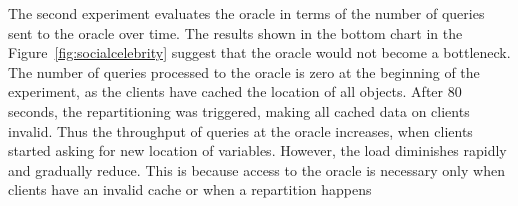 The second experiment evaluates the oracle in terms of the number of queries
sent to the oracle over time. The results shown in the bottom chart in the
Figure~\ref{fig:socialcelebrity} suggest that the oracle would not become a
bottleneck. The number of queries processed to the oracle is zero at the
beginning of the experiment, as the clients have cached the location of all
objects. After 80 seconds, the repartitioning was triggered, making all cached
data on clients invalid. Thus the throughput of queries at the oracle increases,
when clients started asking for new location of variables. However, the load
diminishes rapidly and gradually reduce. This is because access to the oracle is
necessary only when clients have an invalid cache or when a repartition happens


